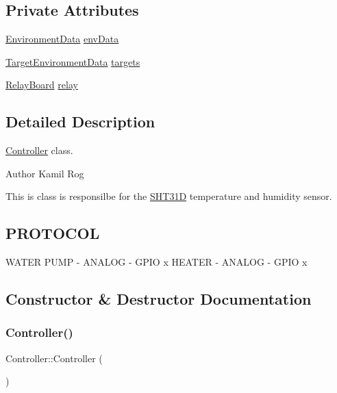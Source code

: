\subsection*{Private Attributes}
\begin{DoxyCompactItemize}
\item 
\hyperlink{structEnvironmentData}{Environment\+Data} \hyperlink{classController_ac99088334f56588243867ca1c18f9633}{env\+Data}
\item 
\hyperlink{structTargetEnvironmentData}{Target\+Environment\+Data} \hyperlink{classController_a8f2fb8295fd3da6ebc8bdb0f25036322}{targets}
\item 
\hyperlink{classRelayBoard}{Relay\+Board} \hyperlink{classController_aa3f1d7aae706a5440adf520cbd7fb216}{relay}
\end{DoxyCompactItemize}


\subsection{Detailed Description}
\hyperlink{classController}{Controller} class. 

\begin{DoxyAuthor}{Author}
Kamil Rog
\end{DoxyAuthor}
This is class is responsilbe for the \hyperlink{classSHT31D}{S\+H\+T31D} temperature and humidity sensor.\hypertarget{classController_PROTOCOL}{}\subsection{P\+R\+O\+T\+O\+C\+OL}\label{classController_PROTOCOL}
W\+A\+T\+ER P\+U\+MP -\/ A\+N\+A\+L\+OG -\/ G\+P\+IO x H\+E\+A\+T\+ER -\/ A\+N\+A\+L\+OG -\/ G\+P\+IO x 

\subsection{Constructor \& Destructor Documentation}
\mbox{\label{classController_a95c56822d667e94b031451729ce069a9}} 
\subsubsection{\texorpdfstring{Controller()}{Controller()}}
{\footnotesize\ttfamily Controller\+::\+Controller (\begin{DoxyParamCaption}{ }\end{DoxyParamCaption})\hspace{0.3cm}{\ttfamily [inline]}}



